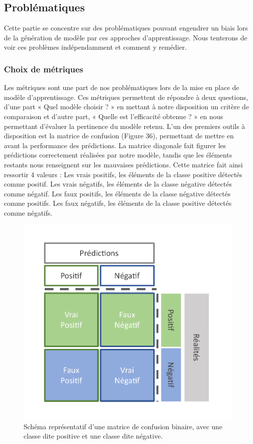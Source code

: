 \subsection{Problématiques}
Cette partie se concentre sur des problématiques pouvant engendrer un biais lors de la génération de modèle par ces approches d’apprentissage. Nous tenterons de voir ces problèmes indépendamment et comment y remédier.

\subsubsection{Choix de métriques}
Les métriques sont une part de nos problématiques lors de la mise en place de modèle d’apprentissage. Ces métriques permettent de répondre à deux questions, d’une part « Quel modèle choisir ? » en mettant à notre disposition un critère de comparaison et d’autre part, « Quelle est l’efficacité obtenue ? » en nous permettant d’évaluer la pertinence du modèle retenu.
L’un des premiers outils à disposition est la matrice de confusion (Figure 36), permettant de mettre en avant la performance des prédictions. La matrice diagonale fait figurer les prédictions correctement réalisées par notre modèle, tandis que les éléments restants nous renseignent sur les mauvaises prédictions. Cette matrice fait ainsi ressortir 4 valeurs :
	Les vrais positifs, les éléments de la classe positive détectés comme positif.
	Les vrais négatifs, les éléments de la classe négative détectés comme négatif.
	Les faux positifs, les éléments de la classe négative détectés comme positifs.
	Les faux négatifs, les éléments de la classe positive détectés comme négatifs.

\begin{figure}[H]
    \centering
    \includegraphics[width=\linewidth]{contents/chapter_3/resources/ConfusionMatrix.pdf}
    \caption{Schéma représentatif d’une matrice de confusion binaire, avec une classe dite positive et une classe dite négative.}
    \label{fig:chapter_3:confusion_matrix}
\end{figure}

